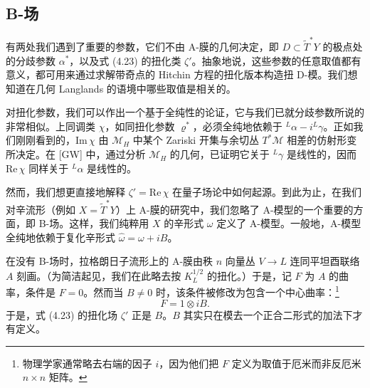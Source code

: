 

\subsection{B-场}

有两处我们遇到了重要的参数，它们不由 A-膜的几何决定，即 $D\subset\widetilde{T}^*Y$ 的极点处的分歧参数 $\alpha^*$，以及式 (4.23) 的扭化类 $\zeta'$。抽象地说，这些参数的任意取值都有意义，都可用来通过求解带奇点的 Hitchin 方程的扭化版本构造扭 D-模。我们想知道在几何 Langlands 的语境中哪些取值是相关的。

对扭化参数，我们可以作出一个基于全纯性的论证，它与我们已就分歧参数所说的非常相似。上同调类 $\chi$，如同扭化参数 $\varrho^*$，必须全纯地依赖于 ${}^L\alpha-i{}^L\gamma$。正如我们刚刚看到的，$\mathrm{Im}\,\chi$ 由 $\mathcal{M}_H$ 中某个 Zariski 开集与余切丛 $T^*\mathcal{M}$ 相差的仿射形变所决定。在 [GW] 中，通过分析 $\mathcal{M}_H$ 的几何，已证明它关于 ${}^L\gamma$ 是线性的，因而 $\mathrm{Re}\,\chi$ 同样关于 ${}^L\alpha$ 是线性的。


然而，我们想更直接地解释 $\zeta'=\mathrm{Re}\,\chi$ 在量子场论中如何起源。到此为止，在我们对辛流形（例如 $X=\widetilde{T}^*Y$）上 A-膜的研究中，我们忽略了 A-模型的一个重要的方面，即 B-场。这样，我们纯粹用 $X$ 的辛形式 $\omega$ 定义了 A-模型。一般地，A-模型全纯地依赖于复化辛形式 $\widehat{\omega}=\omega+iB$。

在没有 B-场时，拉格朗日子流形上的 A-膜由秩 $n$ 向量丛 $V\to L$ 连同平坦酉联络 $A$ 刻画。（为简洁起见，我们在此略去按 $K_L^{1/2}$ 的扭化。）于是，记 $F$ 为 $A$ 的曲率，条件是 $F=0$。然而当 $B\neq0$ 时，该条件被修改为包含一个中心曲率：\footnote{物理学家通常略去右端的因子 $i$，因为他们把 $F$ 定义为取值于厄米而非反厄米 $n\times n$ 矩阵。}
\begin{equation}\tag{4.24}
F=1\otimes iB.
\end{equation}
于是，式 (4.23) 的扭化场 $\zeta'$ 正是 $B$。$B$ 其实只在模去一个正合二形式的加法下才有定义。

